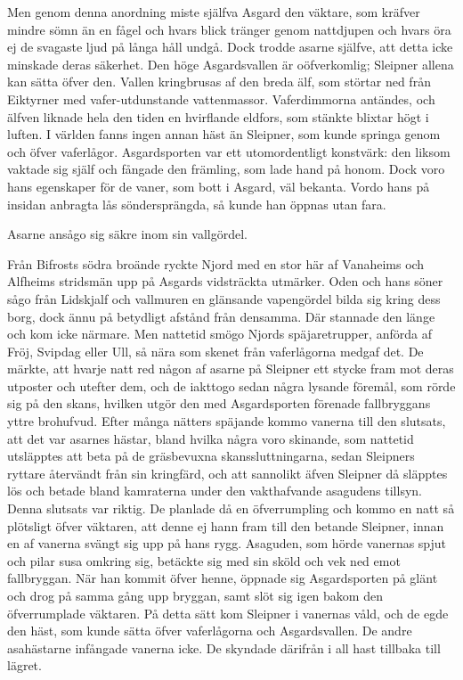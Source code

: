 Men genom denna anordning miste själfva Asgard den väktare, som kräfver
mindre sömn än en fågel och hvars blick tränger genom nattdjupen och
hvars öra ej de svagaste ljud på långa håll undgå. Dock trodde asarne
själfve, att detta icke minskade deras säkerhet. Den höge Asgardsvallen
är oöfverkomlig; Sleipner allena kan sätta öfver den. Vallen kringbrusas
af den breda älf, som störtar ned från Eiktyrner med vafer-utdunstande
vattenmassor. Vaferdimmorna antändes, och älfven liknade hela den tiden
en hvirflande eldfors, som stänkte blixtar högt i luften. I världen
fanns ingen annan häst än Sleipner, som kunde springa genom och öfver
vaferlågor. Asgardsporten var ett utomordentligt konstvärk: den liksom
vaktade sig själf och fångade den främling, som lade hand på honom. Dock
voro hans egenskaper för de vaner, som bott i Asgard, väl bekanta. Vordo
hans på insidan anbragta lås söndersprängda, så kunde han öppnas utan
fara.

Asarne ansågo sig säkre inom sin vallgördel.

Från Bifrosts södra broände ryckte Njord med en stor här af Vanaheims
och Alfheims stridsmän upp på Asgards vidsträckta utmärker. Oden och
hans söner sågo från Lidskjalf och vallmuren en glänsande vapengördel
bilda sig kring
dess borg, dock ännu på betydligt afstånd från densamma. Där stannade
den länge och kom icke närmare. Men nattetid smögo Njords
späjaretrupper, anförda af Fröj, Svipdag eller Ull, så nära som skenet
från vaferlågorna medgaf det. De märkte, att hvarje natt red någon af
asarne på Sleipner ett stycke fram mot deras utposter och utefter dem,
och de iakttogo sedan några lysande föremål, som rörde sig på den skans,
hvilken utgör den med Asgardsporten förenade fallbryggans yttre
brohufvud. Efter många nätters späjande kommo vanerna till den slutsats,
att det var asarnes hästar, bland hvilka några voro skinande, som
nattetid utsläpptes att beta på de gräsbevuxna skanssluttningarna, sedan
Sleipners ryttare återvändt från sin kringfärd, och att sannolikt äfven
Sleipner då släpptes lös och betade bland kamraterna under den
vakthafvande asagudens tillsyn. Denna slutsats var riktig. De planlade
då en öfverrumpling och kommo en natt så plötsligt öfver väktaren, att
denne ej hann fram till den betande Sleipner, innan en af vanerna svängt
sig upp på hans rygg. Asaguden, som hörde vanernas spjut och pilar susa
omkring sig, betäckte sig med sin sköld och vek ned emot fallbryggan.
När han kommit öfver henne, öppnade sig Asgardsporten på glänt och drog
på samma gång upp bryggan, samt slöt sig igen bakom den öfverrumplade
väktaren. På detta sätt kom Sleipner i vanernas våld, och de egde den
häst, som kunde sätta öfver vaferlågorna och Asgardsvallen. De andre
asahästarne infångade vanerna icke. De skyndade därifrån i all hast
tillbaka till lägret.

